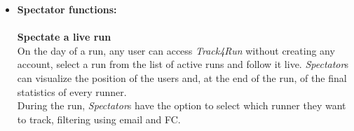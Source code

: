 \documentclass[titlepage]{article}
\begin{document}
\begin{itemize}
{\bf Organize new runs} \\
{\it Track4Run} gives organizers, using a {\it Third Party} account, the possibility to create a run and get data from participants. When creating a run, organizers have to define the path that the run will follow on a map, set the starting time and ending time of the event and the maximum number of participants. When a run is full no more runners can join it.\\
Throughout the event, organizers have access to live data of all participants, and can save that data after the event has finished.\\

	\item{\bf Spectator functions: }\\
	\\
	{\bf Spectate a live run} \\
	On the day of a run, any user can access {\it Track4Run} without creating any account, select a run from the list of active runs and follow it live. {\it Spectator}s can visualize the position of the users and, at the end of the run, of the final statistics of every runner.\\
During the run, {\it Spectator}s have the option to select which runner they want to track, filtering using email and FC.\\
	\end{itemize}
	
\end{document}
